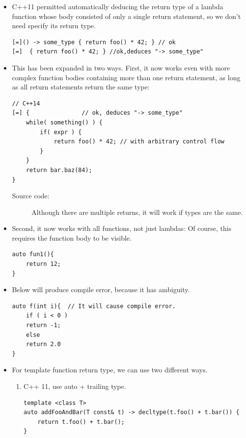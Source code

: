 \documentclass[a4paper,11pt,twoside]{book}
\begin{document}
\begin{itemize}
	\item C++11 permitted automatically deducing the return type of a lambda function whose body consisted of only a single return statement, so we don't need specify its return type.
\begin{lstlisting}[numbers=none]
[=]() -> some_type { return foo() * 42; } // ok
[=]  { return foo() * 42; } //ok,deduces "-> some_type"
\end{lstlisting}
	
	\item This has been expanded in two ways. First, it now works even with more complex function bodies containing more than one return statement, as long as all return statements return the same type:
\begin{lstlisting}
// C++14
[=] {               // ok, deduces "-> some_type"
	while( something() ) {
		if( expr ) {
			return foo() * 42; // with arbitrary control flow
		}
	}
	return bar.baz(84); 
}                       
\end{lstlisting}
	\begin{description}
		\item[Source code:] Although there are multiple returns, it will work if types are the same.
	\end{description}
	
	\item Second, it now works with all functions, not just lambdas: Of course, this requires the function body to be visible.
\begin{lstlisting}[numbers=none]
auto fun1(){
    return 12;
}
\end{lstlisting}
	
	\item Below will produce compile error, because it has ambiguity.
\begin{lstlisting}[numbers=none]
auto f(int i){  // It will cause compile error.
    if ( i < 0 )
    return -1;
    else
    return 2.0
}
\end{lstlisting}

	\item For template function return type, we can use two different ways.
	
	\begin{enumerate}
		\item C++ 11, use auto + trailing type.
\begin{lstlisting}[numbers=none]
template <class T>
auto addFooAndBar(T const& t) -> decltype(t.foo() + t.bar()) {
    return t.foo() + t.bar();
}
\end{lstlisting}


\end{enumerate}
\end{itemize}
\end{document}
